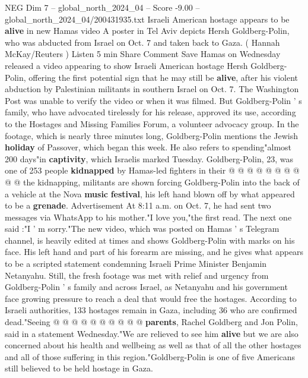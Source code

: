 \begin{textsample}{NEG Dim 7 – global\_north\_2024\_04 – Score -9.00 – global\_north\_2024\_04/200431935.txt}  \label{ex:f7_neg_225}
Israeli American hostage appears to be \textbf{alive} in new Hamas video A poster in Tel Aviv depicts Hersh Goldberg-Polin, who was abducted from Israel on Oct. 7 and taken back to Gaza. ( Hannah McKay/Reuters ) Listen 5 min Share Comment Save Hamas on Wednesday released a video appearing to show Israeli American hostage Hersh Goldberg-Polin, offering the first potential sign that he may still be \textbf{alive}, after his violent abduction by Palestinian militants in southern Israel on Oct. 7.
The Washington Post was unable to verify the video or when it was filmed.
But Goldberg-Polin ' s family, who have advocated tirelessly for his release, approved its use, according to the Hostages and Missing Families Forum, a volunteer advocacy group.
In the footage, which is nearly three minutes long, Goldberg-Polin mentions the Jewish \textbf{holiday} of Passover, which began this week.
He also refers to spending"almost 200 days"in \textbf{captivity}, which Israelis marked Tuesday.
Goldberg-Polin, 23, was one of 253 people \textbf{kidnapped} by Hamas-led fighters in their @ @ @ @ @ @ @ @ @ @ the kidnapping, militants are shown forcing Goldberg-Polin into the back of a vehicle at the Nova \textbf{music} \textbf{festival}, his left hand blown off by what appeared to be a \textbf{grenade}.
Advertisement At 8:11 a.m. on Oct. 7, he had sent two messages via WhatsApp to his mother."I love you,"the first read.
The next one said :"I ' m sorry."The new video, which was posted on Hamas ' s Telegram channel, is heavily edited at times and shows Goldberg-Polin with marks on his face.
His left hand and part of his forearm are missing, and he gives what appears to be a scripted statement condemning Israeli Prime Minister Benjamin Netanyahu.
Still, the fresh footage was met with relief and urgency from Goldberg-Polin ' s family and across Israel, as Netanyahu and his government face growing pressure to reach a deal that would free the hostages.
According to Israeli authorities, 133 hostages remain in Gaza, including 36 who are confirmed dead."Seeing @ @ @ @ @ @ @ @ @ @ \textbf{parents}, Rachel Goldberg and Jon Polin, said in a statement Wednesday."We are relieved to see him \textbf{alive} but we are also concerned about his health and wellbeing as well as that of all the other hostages and all of those suffering in this region."Goldberg-Polin is one of five Americans still believed to be held hostage in Gaza.

\end{textsample}
